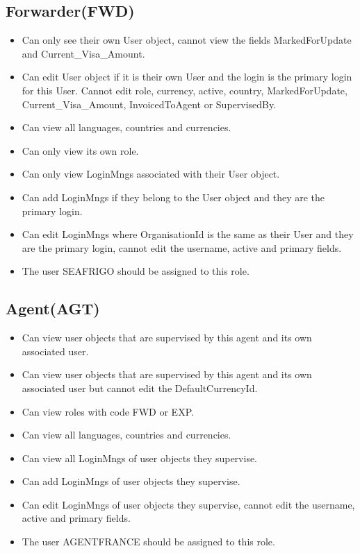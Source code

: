 \subsection{Forwarder(FWD)}
\begin{itemize}
    \item Can only see their own User object,  cannot view the fields MarkedForUpdate and Current\_Visa\_Amount.
    \item Can edit User object if it is their own User and the login is the primary login for this User. Cannot edit role, currency, active, country, MarkedForUpdate, Current\_Visa\_Amount, InvoicedToAgent or SupervisedBy.
    \item Can view all languages, countries and currencies.
    \item Can only view its own role.
    \item Can only view LoginMngs associated with their User object.
    \item Can add LoginMngs if they belong to the User object and they are the primary login.
    \item Can edit LoginMngs where OrganisationId is the same as their User and they are the primary login, cannot edit the username, active and primary fields.
    \item The user SEAFRIGO should be assigned to this role.
\end{itemize}

\subsection{Agent(AGT)}
\begin{itemize}
    \item Can view user objects that are supervised by this agent and its own associated user.
    \item Can view user objects that are supervised by this agent and its own associated user but cannot edit the DefaultCurrencyId.
    \item Can view roles with code FWD or EXP.
    \item Can view all languages, countries and currencies.
    \item Can view all LoginMngs of user objects they supervise.
    \item Can add LoginMngs of user objects they supervise.
    \item Can edit LoginMngs of user objects they supervise, cannot edit the username, active and primary fields.
    \item The user AGENTFRANCE should be assigned to this role.
\end{itemize}

